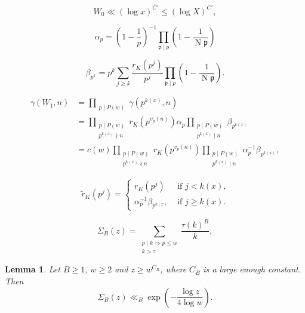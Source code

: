 \documentclass[10pt,a4paper]{amsart}
\newtheorem{lemma}{Lemma}
\newcommand{\fp}{\mathfrak{p}}
\renewcommand{\geq}{\geqslant}
\renewcommand{\leq}{\leqslant}
\DeclareMathOperator{\n}{N}
\begin{document}
\begin{equation}\label{eq:W0}
W_0\ll (\log x)^{C'}\leq (\log X)^{C'},
\end{equation}

\begin{equation}\label{eq:alpha-p}
\alpha_p=\left(1-\frac{1}{p}\right)^{-1}\prod_{\fp\mid p} \left(1-\frac{1}{\n \fp}\right)
\end{equation}

\begin{equation}\label{eq:beta-p}
\beta_{p^k}=p^k\sum_{j\geq k} \frac{r_K(p^j)}{p^j}\prod_{\fp\mid p} \left(1-\frac{1}{\n \fp}\right).
\end{equation}

\begin{equation}\label{eq:calc}
\begin{split}
\gamma(W_1,n)
&=\prod_{\substack{p\mid P(w)}} \gamma(p^{k(x)},n) \\
&=\prod_{\substack{p\mid P(w)\\
p^{k(x)}\nmid n}}
r_K(p^{v_p(n)}) \alpha_p
\prod_{\substack{p\mid P(w)\\
p^{k(x)}\mid n
}}
\beta_{p^{k(x)}}\\
&=c(w)
\prod_{\substack{p\mid P(w)\\
p^{k(x)}\nmid n}}
r_K(p^{v_p(n)}) 
\prod_{\substack{p\mid P(w)\\
p^{k(x)}\mid n
}}
\alpha_p^{-1}\beta_{p^{k(x)}},
\end{split}
\end{equation}

\begin{equation}\label{eq:r-tilde}
\tilde r_K (p^j) =\begin{cases}
r_K(p^j) &\text{ if $j<k(x)$,}\\
\alpha_p^{-1}\beta_{p^{k(x)}} &\text{ if $j\geq k(x)$.}
\end{cases}
\end{equation}

\begin{equation}\label{eq:definition-sig0}
\Sigma_B(z)=\sum_{\substack{p\mid k \Rightarrow p\leq w\\ k>z}} \frac{\tau(k)^{B}}{k},
\end{equation}

\begin{lemma}\label{lem:gouda}
Let $B\geq 1$, $w\geq 2$ and $z\geq w^{C_B}$, where $C_B$ is a large enough constant. Then 
$$
\Sigma_{B}(z)\ll_B
\exp\left(-\frac{\log z}{4\log w} \right).
$$
\end{lemma}
\end{document}
